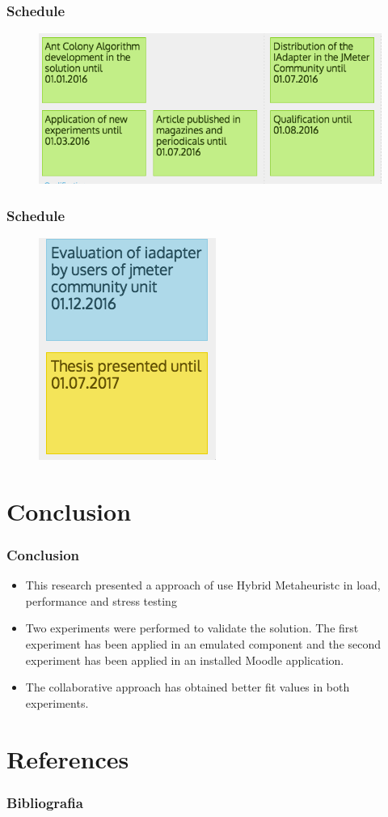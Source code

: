 \documentclass{beamer}
\begin{document}
\begin{frame}
\frametitle{Schedule}
\begin{figure}[H]
\centering
\includegraphics[width=1\linewidth]{stories3.PNG}
\end{figure}
\end{frame}

\begin{frame}
\frametitle{Schedule}
\begin{figure}[H]
\centering
\includegraphics[width=0.5\linewidth]{stories2.PNG}
\end{figure}
\end{frame}




\section{Conclusion}

\begin{frame}
\frametitle{Conclusion}

\begin{itemize}
\item This research presented a approach of use Hybrid Metaheuristc in load, performance and stress testing
\item Two experiments were performed to validate the solution. The first experiment has been applied in an emulated component and the second experiment has been applied in an installed Moodle application.
\item The collaborative approach has obtained better fit values in both experiments.
\end{itemize}
\end{frame}


\section{References}

\begin{frame}[allowframebreaks]
\frametitle{Bibliografia}



\end{frame}
\end{document}
